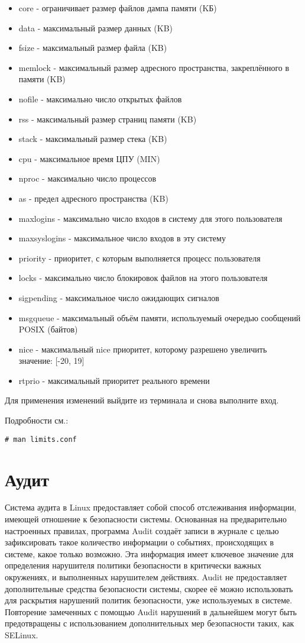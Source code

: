 \documentclass[a4paper,10pt,twoside]{article}
\begin{document}
\begin{itemize}
 \item core - ограничивает размер файлов дампа памяти (KБ)
\item data - максимальный размер данных (KB)
\item fsize - максимальный размер файла (KB)
\item memlock - максимальный размер адресного пространства, закреплённого в памяти (KB)
\item nofile - максимально число открытых файлов
\item rss - максимальный размер страниц памяти (KB)
\item stack - максимальный размер стека (KB)
\item cpu - максимальное время ЦПУ (MIN)
\item nproc - максимально число процессов
\item as - предел адресного пространства (KB)
\item maxlogins - максимально число входов в систему для этого пользователя
\item maxsyslogins - максимальное число входов в эту систему
\item priority - приоритет, с которым выполняется процесс пользователя
\item locks - максимально число блокировок файлов на этого пользователя
\item sigpending - максимальное число ожидающих сигналов
\item msgqueue - максимальный объём памяти, используемый очередью сообщений POSIX (байтов)
\item nice - максимальный nice приоритет, которому разрешено увеличить значение: [-20, 19]
\item rtprio - максимальный приоритет реального времени
\end{itemize}


Для применения изменений выйдите из терминала и снова выполните вход.

Подробности см.: 
\begin{verbatim}
# man limits.conf
\end{verbatim} 


\section{Аудит}


Система аудита в Linux предоставляет собой способ отслеживания информации, имеющей отношение к безопасности системы. Основанная на предварительно настроенных правилах, программа Audit создаёт записи в журнале с целью зафиксировать такое количество информации о событиях, происходящих в системе, какое только возможно. Эта информация имеет ключевое значение для определения нарушителя политики безопасности в критически важных окружениях, и выполненных нарушителем действиях. Audit не предоставляет дополнительные средства безопасности системы, скорее её можно использовать для раскрытия нарушений политик безопасности, уже используемых в системе. Повторение замеченных с помощью Audit нарушений в дальнейшем могут быть предотвращены с использованием дополнительных мер безопасности таких, как SELinux.
\end{document}
